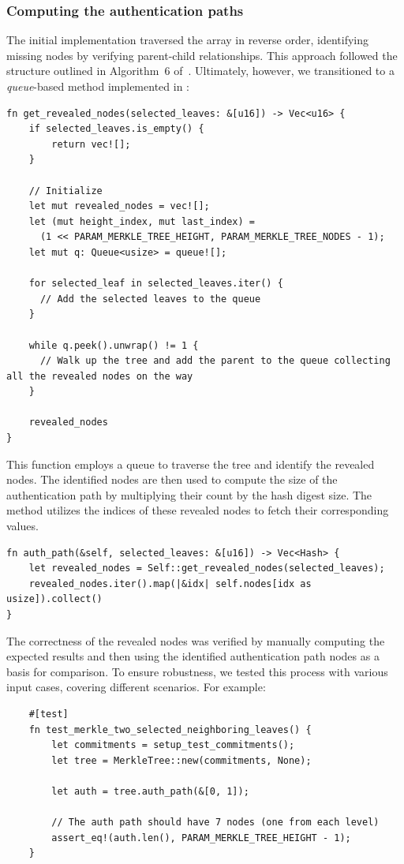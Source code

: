 \documentclass[11pt]{report}
\theoremstyle{definition}
\theoremstyle{plain}
\begin{document}
\subsubsection{Computing the authentication paths}\label{sub:auth_path}
The initial implementation traversed the array in reverse order, identifying missing nodes by verifying parent-child relationships. This approach followed the structure outlined in Algorithm~6 of~\cite[p30]{aguilarsyndrome11}. Ultimately, however, we transitioned to a \textit{queue}-based method implemented in :

\begin{verbatim}
fn get_revealed_nodes(selected_leaves: &[u16]) -> Vec<u16> {
    if selected_leaves.is_empty() {
        return vec![];
    }

    // Initialize
    let mut revealed_nodes = vec![];
    let (mut height_index, mut last_index) = 
      (1 << PARAM_MERKLE_TREE_HEIGHT, PARAM_MERKLE_TREE_NODES - 1);
    let mut q: Queue<usize> = queue![];

    for selected_leaf in selected_leaves.iter() {
      // Add the selected leaves to the queue
    }

    while q.peek().unwrap() != 1 {
      // Walk up the tree and add the parent to the queue collecting all the revealed nodes on the way
    }

    revealed_nodes
}
\end{verbatim}

This function employs a queue to traverse the tree and identify the revealed nodes. The identified nodes are then used to compute the size of the authentication path by multiplying their count by the hash digest size. The  method utilizes the indices of these revealed nodes to fetch their corresponding values.

\begin{verbatim}
fn auth_path(&self, selected_leaves: &[u16]) -> Vec<Hash> {
    let revealed_nodes = Self::get_revealed_nodes(selected_leaves);
    revealed_nodes.iter().map(|&idx| self.nodes[idx as usize]).collect()
}
\end{verbatim}

The correctness of the revealed nodes was verified by manually computing the expected results and then using the identified authentication path nodes as a basis for comparison. To ensure robustness, we tested this process with various input cases, covering different scenarios. For example:

\begin{verbatim}
    #[test]
    fn test_merkle_two_selected_neighboring_leaves() {
        let commitments = setup_test_commitments();
        let tree = MerkleTree::new(commitments, None);

        let auth = tree.auth_path(&[0, 1]);

        // The auth path should have 7 nodes (one from each level)
        assert_eq!(auth.len(), PARAM_MERKLE_TREE_HEIGHT - 1);
    }
\end{verbatim}
\end{document}
